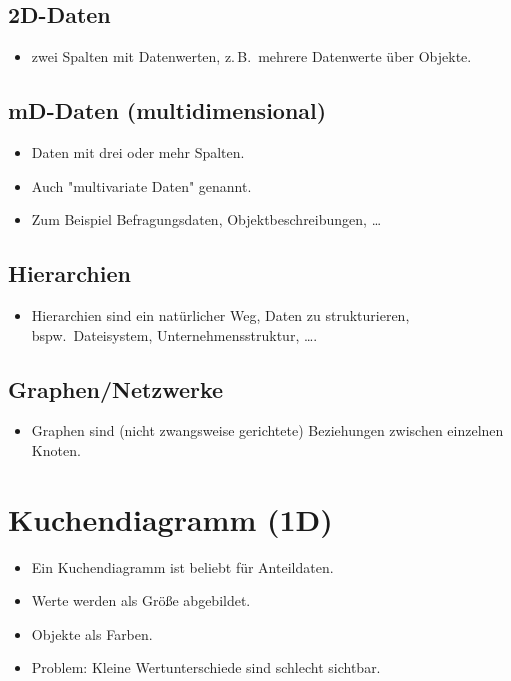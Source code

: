 \documentclass[a4paper, 11pt, accentcolor = tud3b]{tudreport}
\newcommand{\bspw}{bspw.~}
\newcommand{\zB}{z.\,B.~}
\begin{document}
			\subsection{2D-Daten}
				\begin{itemize}
					\item zwei Spalten mit Datenwerten, \zB mehrere Datenwerte über Objekte.
				\end{itemize}

			\subsection{mD-Daten (multidimensional)}
				\begin{itemize}
					\item Daten mit drei oder mehr Spalten.
					\item Auch "multivariate Daten" genannt.
					\item Zum Beispiel Befragungsdaten, Objektbeschreibungen, \dots
				\end{itemize}

			\subsection{Hierarchien}
				\begin{itemize}
					\item Hierarchien sind ein natürlicher Weg, Daten zu strukturieren, \bspw Dateisystem, Unternehmensstruktur, \dots.
				\end{itemize}

			\subsection{Graphen/Netzwerke}
				\begin{itemize}
					\item Graphen sind (nicht zwangsweise gerichtete) Beziehungen zwischen einzelnen Knoten.
				\end{itemize}

		\section{Kuchendiagramm (1D)}
			\begin{itemize}
				\item Ein Kuchendiagramm ist beliebt für Anteildaten.
				\item Werte werden als Größe abgebildet.
				\item Objekte als Farben.
				\item Problem: Kleine Wertunterschiede sind schlecht sichtbar.
			\end{itemize}
\end{document}
